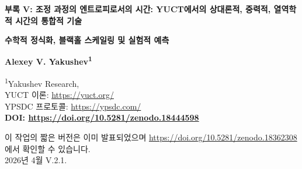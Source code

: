 \documentclass[12pt,a4paper]{article}
\newcommand{\Keff}{K_{\mathrm{eff}}}
\begin{document}
	
	\begin{titlepage}
		\begin{center}
			\vspace*{1cm}
			
			{\Huge\textbf{부록 V: 조정 과정의 엔트로피로서의 시간: YUCT에서의 상대론적, 중력적, 열역학적 시간의 통합적 기술}}
			
			\vspace{1cm}
			{\Large\textbf{수학적 정식화, 블랙홀 스케일링 및 실험적 예측}}
			
			\vspace{1.5cm}
			
			{\Large\textbf{Alexey V. Yakushev\textsuperscript{1}}}
			
			\vspace{0.3cm}
			\large
			\textsuperscript{1}Yakushev Research, \\	YUCT 이론: \url{https://yuct.org/}\\
			YPSDC 프로토콜: \url{https://ypsdc.com/}\\
			
			
			\vspace{2cm}
			\textbf{DOI: \url{https://doi.org/10.5281/zenodo.18444598}}\\
			
			\vspace{1cm}
			
			\large 
			이 작업의 짧은 버전은 이미 발표되었으며 \url{https://doi.org/10.5281/zenodo.18362308} 에서 확인할 수 있습니다.\\
			\vspace{1cm}
			2026년 4월 \quad \large V.2.1.
			
			\vspace{2cm}
			
			\begin{minipage}{0.9\textwidth}
				\begin{abstract}
					\noindent
					본 부록은 야쿠셰프 통합 조정 이론(Yakushev Unified Coordination Theory, YUCT) 내에서 시간에 대한 새로운 해석을 제시한다. 시간은 조정 효율 \(\Keff\)에 의해 정량화되는 조정 과정의 엔트로피와 동일시된다. 특수 상대성 이론의 로렌츠 인자 \(\gamma\)와 일반 상대성 이론의 중력적 시간 지연이 \(\Keff\)의 특정한 형태로서 자연스럽게 창발함을 보인다. 고유 시간에 대한 통합 표현 \(d\tau = dt/\Keff(v,\Phi)\)이 유도되며, 이는 적절한 극한에서 표준 공식으로 환원된다. 광자(\(v=c\))에 대해서는 \(\Keff \to \infty\)가 되어 고유 시간이 사라지며, 빛이 시간을 경험하지 않는 이유를 설명한다. 조정 엔트로피의 양자화는 플랑크 스케일에서 시간의 근본적인 불연속성을 초래하며, 이는 양자 중력으로 연결된다.
					

\end{abstract}
\end{minipage}
\end{center}
\end{titlepage}
\end{document}
